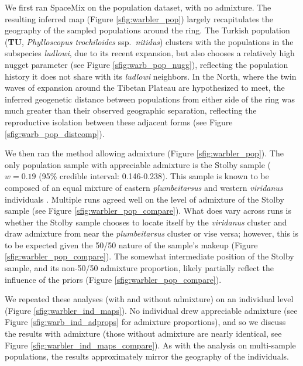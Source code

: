 \documentclass[12pt]{article}
\begin{document}
We first ran SpaceMix on the population dataset, with no admixture. The resulting inferred map (Figure \ref{sfig:warbler_pop}) largely recapitulates the geography of the sampled populations around the ring.  The Turkish population (\textbf{TU}, \textit{Phylloscopus trochiloides} ssp.\ \textit{nitidus}) clusters with the populations in the subspecies \textit{ludlowi}, due to its recent expansion, but also chooses a relatively high nugget parameter (see Figure \ref{sfig:warb_pop_nugg}), reflecting the population history it does not share with its \textit{ludlowi} neighbors.  In the North, where the twin waves of expansion around the Tibetan Plateau are hypothesized to meet, the inferred geogenetic distance between populations from either side of the ring was much greater than their observed geographic separation, reflecting the reproductive isolation between these adjacent forms (see Figure \ref{sfig:warb_pop_distcomp}).  

We then ran the method allowing admixture (Figure \ref{sfig:warbler_pop}). The only population sample with appreciable admixture is the Stolby sample ($w=0.19$ (95\% credible interval: 0.146-0.238).  This sample is known to be composed of an equal mixture of eastern \textit{plumbeitarsus} and western \textit{viridanus} individuals \citep{alcaide2014genomic}. Multiple runs agreed well on the level of admixture of the Stolby sample (see Figure \ref{sfig:warbler_pop_compare}). What does vary across runs is whether the Stolby sample chooses to locate itself by the \textit{viridanus} cluster and draw admixture from near the \textit{plumbeitarsus}  cluster or vise versa; however, this is to be expected given the 50/50 nature of the sample's makeup (Figure \ref{sfig:warbler_pop_compare}). The somewhat intermediate position of the Stolby sample, and its non-50/50 admixture proportion, likely partially reflect the influence of the priors (Figure \ref{sfig:warbler_pop_compare}). 

We repeated these analyses (with and without admixture) on an individual level (Figure \ref{sfig:warbler_ind_maps}).  
No individual drew appreciable admixture (see Figure \ref{sfig:warb_ind_adprops} for admixture proportions), and so we discuss the results with admixture (those without admixture are nearly identical, see Figure \ref{sfig:warbler_ind_maps_compare}).  As with the analysis on multi-sample populations, the results approximately mirror the geography of the individuals.
\end{document}
